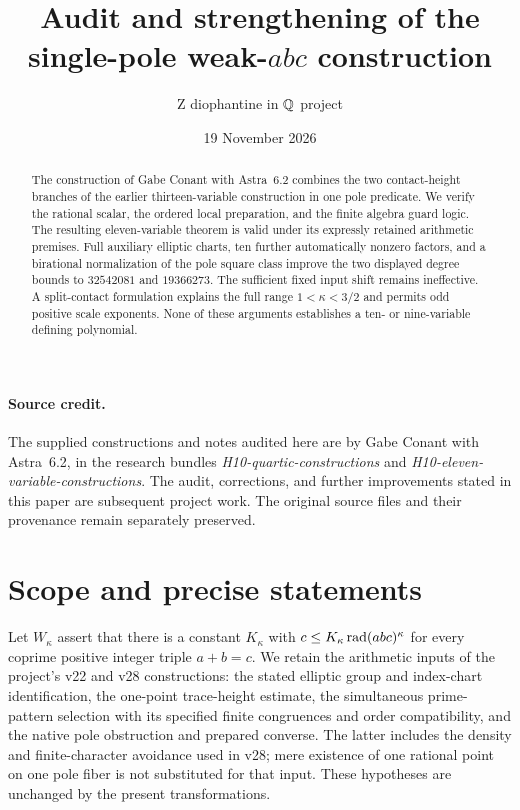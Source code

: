 \documentclass[11pt,a4paper]{article}
\title{Audit and strengthening of the single-pole weak-$abc$ construction}
\author{Z diophantine in $\mathbb Q$ project}
\date{19 November 2026}
\begin{document}
\maketitle
\begin{abstract}
The construction of Gabe Conant with Astra~6.2 combines the two contact-height branches
of the earlier thirteen-variable construction in one pole predicate. We
verify the rational scalar, the ordered local preparation, and the finite
algebra guard logic. The resulting eleven-variable theorem is valid under
its expressly retained arithmetic premises. Full auxiliary elliptic
charts, ten further automatically nonzero factors, and a birational
normalization of the pole square class improve the two displayed degree
bounds to $32542081$ and $19366273$. The sufficient fixed input shift
remains ineffective. A split-contact formulation explains the full range
$1<\kappa<3/2$ and permits odd positive scale exponents. None of these
arguments establishes a ten- or nine-variable defining polynomial.
\end{abstract}

\paragraph{Source credit.}
The supplied constructions and notes audited here are by Gabe Conant with
Astra~6.2, in the research bundles
\emph{H10-quartic-constructions} and
\emph{H10-eleven-variable-constructions}.
The audit, corrections, and further improvements stated in this paper are
subsequent project work. The original source files and their provenance
remain separately preserved.

\section{Scope and precise statements}
Let $W_\kappa$ assert that there is a constant $K_\kappa$ with
$c\le K_\kappa\operatorname{rad}(abc)^\kappa$ for every coprime positive integer triple
$a+b=c$. We retain the arithmetic inputs of the project's v22 and v28
constructions: the stated elliptic group and index-chart identification,
the one-point trace-height estimate, the simultaneous prime-pattern
selection with its specified finite congruences and order compatibility,
and the native pole obstruction and prepared converse. The latter includes
the density and finite-character avoidance used in v28; mere existence of
one rational point on one pole fiber is not substituted for that input.
These hypotheses are unchanged by the present transformations.
\end{document}
